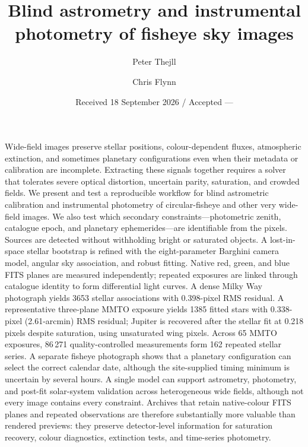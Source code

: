 \documentclass{aa}
\begin{document}
\title{Blind astrometry and instrumental photometry of fisheye sky images}
\author{Peter Thejll \and Chris Flynn}
\date{Received 18 September 2026 / Accepted ---}

\abstract
{Wide-field images preserve stellar positions, colour-dependent fluxes,
atmospheric extinction, and sometimes planetary configurations even when their
metadata or calibration are incomplete. Extracting these signals together
requires a solver that tolerates severe optical distortion, uncertain parity,
saturation, and crowded fields.}
{We present and test a reproducible workflow for blind astrometric calibration
and instrumental photometry of circular-fisheye and other very wide-field
images. We also test which secondary constraints---photometric zenith,
catalogue epoch, and planetary ephemerides---are identifiable from the pixels.}
{Sources are detected without withholding bright or saturated objects. A
lost-in-space stellar bootstrap is refined with the eight-parameter Barghini
camera model, angular sky association, and robust fitting. Native red, green,
and blue FITS planes are measured independently; repeated exposures are linked
through catalogue identity to form differential light curves.}
{A dense Milky Way photograph yields 3653 stellar associations with
0.398-pixel RMS residual. A representative three-plane MMTO exposure yields
1385 fitted stars with 0.338-pixel (2.61-arcmin) RMS residual; Jupiter is
recovered after the stellar fit at 0.218 pixels despite saturation, using
unsaturated wing pixels. Across 65 MMTO exposures, 86\,271 quality-controlled
measurements form 162 repeated stellar series. A separate fisheye photograph
shows that a planetary configuration can select the correct calendar date,
although the site-supplied timing minimum is uncertain by several hours.}
{A single model can support astrometry, photometry, and post-fit solar-system
validation across heterogeneous wide fields, although not every image contains
every constraint. Archives that retain native-colour FITS planes and repeated
observations are therefore substantially more valuable than rendered previews:
they preserve detector-level information for saturation recovery, colour
diagnostics, extinction tests, and time-series photometry.}
\maketitle
\end{document}
